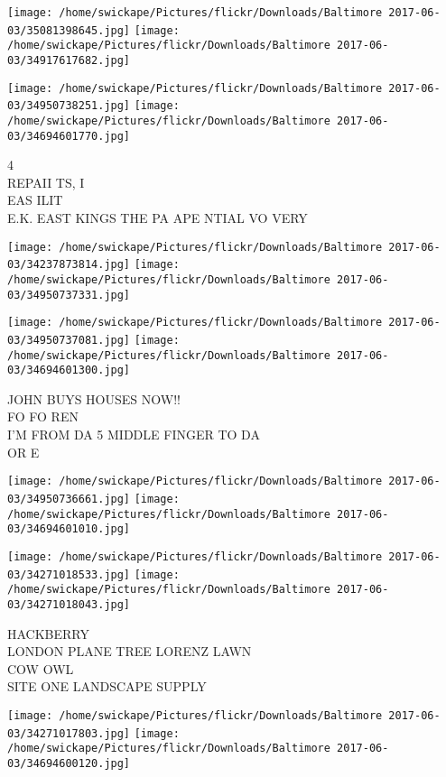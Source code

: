 \documentclass[10pt,letterpaper]{article}
\begin{document}
\texttt{[image: /home/swickape/Pictures/flickr/Downloads/Baltimore 2017-06-03/35081398645.jpg]}
\texttt{[image: /home/swickape/Pictures/flickr/Downloads/Baltimore 2017-06-03/34917617682.jpg]}

\texttt{[image: /home/swickape/Pictures/flickr/Downloads/Baltimore 2017-06-03/34950738251.jpg]}
\texttt{[image: /home/swickape/Pictures/flickr/Downloads/Baltimore 2017-06-03/34694601770.jpg]}

4\\
REPAII TS, I\\
EAS ILIT\\
E.K. EAST KINGS THE PA APE NTIAL VO VERY\\
\pagebreak

\texttt{[image: /home/swickape/Pictures/flickr/Downloads/Baltimore 2017-06-03/34237873814.jpg]}
\texttt{[image: /home/swickape/Pictures/flickr/Downloads/Baltimore 2017-06-03/34950737331.jpg]}

\texttt{[image: /home/swickape/Pictures/flickr/Downloads/Baltimore 2017-06-03/34950737081.jpg]}
\texttt{[image: /home/swickape/Pictures/flickr/Downloads/Baltimore 2017-06-03/34694601300.jpg]}

JOHN BUYS HOUSES NOW!!\\
FO FO REN\\
I'M FROM DA 5 MIDDLE FINGER TO DA\\
OR E\\
\pagebreak

\texttt{[image: /home/swickape/Pictures/flickr/Downloads/Baltimore 2017-06-03/34950736661.jpg]}
\texttt{[image: /home/swickape/Pictures/flickr/Downloads/Baltimore 2017-06-03/34694601010.jpg]}

\texttt{[image: /home/swickape/Pictures/flickr/Downloads/Baltimore 2017-06-03/34271018533.jpg]}
\texttt{[image: /home/swickape/Pictures/flickr/Downloads/Baltimore 2017-06-03/34271018043.jpg]}

HACKBERRY\\
LONDON PLANE TREE LORENZ LAWN\\
COW OWL\\
SITE ONE LANDSCAPE SUPPLY\\
\pagebreak

\texttt{[image: /home/swickape/Pictures/flickr/Downloads/Baltimore 2017-06-03/34271017803.jpg]}
\texttt{[image: /home/swickape/Pictures/flickr/Downloads/Baltimore 2017-06-03/34694600120.jpg]}
\end{document}
